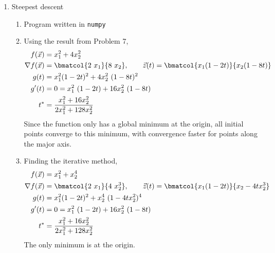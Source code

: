 \begin{enumerate}
    \item Steepest descent
          \begin{enumerate}
              \item Program written in \texttt{numpy}
              \item Using the result from Problem 7,
                    \begin{align}
                        f(\vec{x})        & = x_1^2 + 4x_2^2                      \\
                        \nabla f(\vec{x}) & = \bmatcol{2\ x_1}{8\ x_2}, \qquad
                        \vec{z}(t) = \bmatcol{x_1(1-2t)}{x_2(1 - 8t)}             \\
                        g(t)              & = x_1^2 (1-2t)^2 + 4x_2^2\ (1 - 8t)^2 \\
                        g'(t)             & = 0 = x_1^2\ (1-2t)
                        + 16 x_2^2\ (1 - 8t)                                      \\
                        t^*               & = \frac{x_1^2 + 16x_2^2}{2x_1^2
                            + 128x_2^2}
                    \end{align}
                    Since the function only has a global minimum at the origin, all
                    initial points converge to this minimum, with convergence faster for
                    points along the major axis.

              \item Finding the iterative method,
                    \begin{align}
                        f(\vec{x})        & = x_1^2 + x_2^4                           \\
                        \nabla f(\vec{x}) & = \bmatcol{2\ x_1}{4\ x_2^3}, \qquad
                        \vec{z}(t) = \bmatcol{x_1(1-2t)}{x_2 - 4tx_2^3}               \\
                        g(t)              & = x_1^2 (1-2t)^2 + x_2^4\ (1 - 4tx_2^2)^4 \\
                        g'(t)             & = 0 = x_1^2\ (1-2t)
                        + 16 x_2^2\ (1 - 8t)                                          \\
                        t^*               & = \frac{x_1^2 + 16x_2^2}{2x_1^2
                            + 128x_2^2}
                    \end{align}
                    The only minimum is at the origin.
          \end{enumerate}
\end{enumerate}